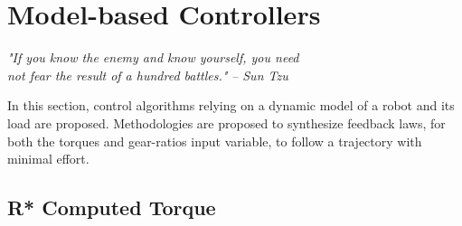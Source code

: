 



\newpage

\section{Model-based Controllers}
\label{sec:HierachicalControlApproach}


\begin{flushright}
\textit{"If you know the enemy and know yourself, you need \\ not fear the result of a hundred battles."}  \emph{-- Sun Tzu}
\end{flushright}
\vspace{+10pt}


In this section, control algorithms relying on a dynamic model of a robot and its load are proposed. Methodologies are proposed to synthesize feedback laws, for both the torques and gear-ratios input variable, to follow a trajectory with minimal effort. 


\subsection{R* Computed Torque}
\label{sec:RobustTrajectoryFollowingController}


